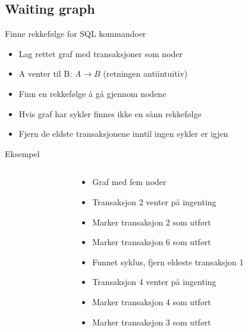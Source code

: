 \subsection*{Waiting graph}
\begin{frame}{Finne rekkefølge for SQL kommandoer}
\begin{itemize}
    \item Lag rettet graf med transaksjoner som noder
    \item A venter til B: $A \rightarrow B$ (retningen antiintuitiv)
    \item Finn en rekkefølge å gå gjennom nodene
    \item Hvis graf har sykler finnes ikke en sånn rekkefølge
    \item Fjern de eldste transaksjonene inntil ingen sykler er igjen
\end{itemize}
\end{frame}

\begin{frame}{Eksempel}
\begin{columns}
    \begin{column}{0.48\textwidth}
 \end{column}
    \begin{column}{0.48\textwidth}
\begin{itemize}
    \item<1-> Graf med fem noder 
    \item<2-> Transaksjon 2 venter på ingenting
    \item<3-> Marker transaksjon 2 som utført
    \item<4-> Marker transaksjon 6 som utført
    \item<5-> Funnet syklus, fjern eldeste transaksjon 1
    \item<6-> Transaksjon 4 venter på ingenting
    \item<7-> Marker transaksjon 4 som utført
    \item<8-> Marker transaksjon 3 som utført
\end{itemize}
 \end{column}
\end{columns}
\end{frame}

